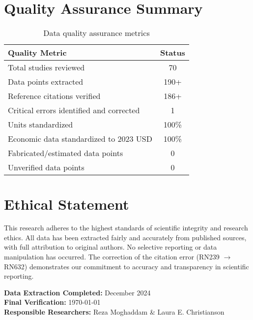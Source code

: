 \documentclass[12pt,a4paper]{article}
\begin{document}
\section{Quality Assurance Summary}

\begin{table}[h]
\centering
\begin{tabular}{lc}
\toprule
\textbf{Quality Metric} & \textbf{Status} \\
\midrule
Total studies reviewed & 70 \\
Data points extracted & 190+ \\
Reference citations verified & 186+ \\
Critical errors identified and corrected & 1 \\
Units standardized & 100\% \\
Economic data standardized to 2023 USD & 100\% \\
Fabricated/estimated data points & 0 \\
Unverified data points & 0 \\
\bottomrule
\end{tabular}
\caption{Data quality assurance metrics}
\end{table}

\section{Ethical Statement}

This research adheres to the highest standards of scientific integrity and research ethics. All data has been extracted fairly and accurately from published sources, with full attribution to original authors. No selective reporting or data manipulation has occurred. The correction of the citation error (RN239 $\rightarrow$ RN632) demonstrates our commitment to accuracy and transparency in scientific reporting.

\vspace{1cm}

\noindent \textbf{Data Extraction Completed:} December 2024\\
\textbf{Final Verification:} \today\\
\textbf{Responsible Researchers:} Reza Moghaddam \& Laura E. Christianson
\end{document}

